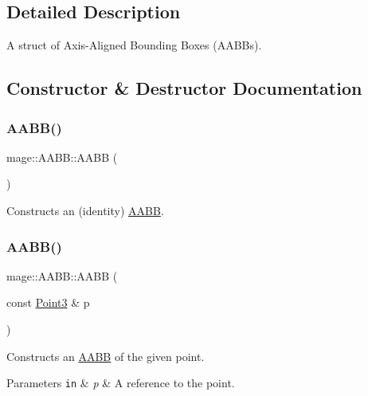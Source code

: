 \subsection{Detailed Description}
A struct of Axis-\/\+Aligned Bounding Boxes (A\+A\+B\+Bs). 

\subsection{Constructor \& Destructor Documentation}
\hypertarget{structmage_1_1_a_a_b_b_ae6db94dcb9165eb008f0be8741f0eb62}{}\label{structmage_1_1_a_a_b_b_ae6db94dcb9165eb008f0be8741f0eb62} 
\subsubsection{\texorpdfstring{A\+A\+B\+B()}{AABB()}\hspace{0.1cm}{\footnotesize\ttfamily [1/6]}}
{\footnotesize\ttfamily mage\+::\+A\+A\+B\+B\+::\+A\+A\+BB (\begin{DoxyParamCaption}{ }\end{DoxyParamCaption})}

Constructs an (identity) \hyperlink{structmage_1_1_a_a_b_b}{A\+A\+BB}. \hypertarget{structmage_1_1_a_a_b_b_a03a5ca9571075c5e12c5e7a4a38913bf}{}\label{structmage_1_1_a_a_b_b_a03a5ca9571075c5e12c5e7a4a38913bf} 
\subsubsection{\texorpdfstring{A\+A\+B\+B()}{AABB()}\hspace{0.1cm}{\footnotesize\ttfamily [2/6]}}
{\footnotesize\ttfamily mage\+::\+A\+A\+B\+B\+::\+A\+A\+BB (\begin{DoxyParamCaption}\item[{const \hyperlink{structmage_1_1_point3}{Point3} \&}]{p }\end{DoxyParamCaption})\hspace{0.3cm}{\ttfamily [explicit]}}

Constructs an \hyperlink{structmage_1_1_a_a_b_b}{A\+A\+BB} of the given point.


\begin{DoxyParams}[1]{Parameters}
\mbox{\tt in}  & {\em p} & A reference to the point. \\
\hline
\end{DoxyParams}
\hypertarget{structmage_1_1_a_a_b_b_aff9e36907c435c74cc948a13cc9f1222}{}\label{structmage_1_1_a_a_b_b_aff9e36907c435c74cc948a13cc9f1222} 
